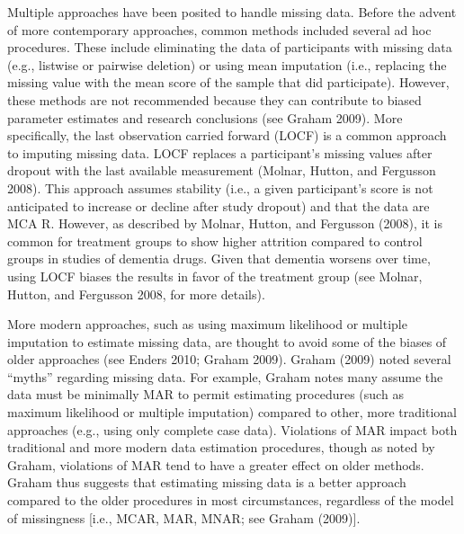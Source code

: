 \documentclass[
  letterpaper,
  DIV=11,
  numbers=noendperiod]{scrartcl}
\begin{document}
Multiple approaches have been posited to handle missing data. Before the
advent of more contemporary approaches, common methods included several
ad hoc procedures. These include eliminating the data of participants
with missing data (e.g., listwise or pairwise deletion) or using mean
imputation (i.e., replacing the missing value with the mean score of the
sample that did participate). However, these methods are not recommended
because they can contribute to biased parameter estimates and research
conclusions (see Graham 2009). More specifically, the last observation
carried forward (LOCF) is a common approach to imputing missing data.
LOCF replaces a participant's missing values after dropout with the last
available measurement (Molnar, Hutton, and Fergusson 2008). This
approach assumes stability (i.e., a given participant's score is not
anticipated to increase or decline after study dropout) and that the
data are MCA R. However, as described by Molnar, Hutton, and Fergusson
(2008), it is common for treatment groups to show higher attrition
compared to control groups in studies of dementia drugs. Given that
dementia worsens over time, using LOCF biases the results in favor of
the treatment group (see Molnar, Hutton, and Fergusson 2008, for more
details).

More modern approaches, such as using maximum likelihood or multiple
imputation to estimate missing data, are thought to avoid some of the
biases of older approaches (see Enders 2010; Graham 2009). Graham (2009)
noted several ``myths'' regarding missing data. For example, Graham
notes many assume the data must be minimally MAR to permit estimating
procedures (such as maximum likelihood or multiple imputation) compared
to other, more traditional approaches (e.g., using only complete case
data). Violations of MAR impact both traditional and more modern data
estimation procedures, though as noted by Graham, violations of MAR tend
to have a greater effect on older methods. Graham thus suggests that
estimating missing data is a better approach compared to the older
procedures in most circumstances, regardless of the model of missingness
{[}i.e., MCAR, MAR, MNAR; see Graham (2009){]}.
\end{document}
